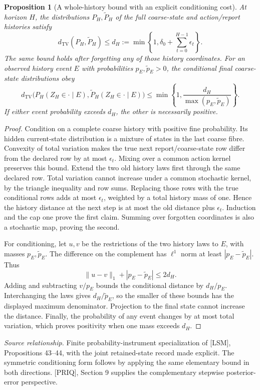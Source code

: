 \documentclass[11pt,oneside,openany]{book}
\newtheorem{proposition}[theorem]{Proposition}
\theoremstyle{definition}\newtheorem{definition}[theorem]{Definition}
\newcommand{\TV}{d_{\mathrm{TV}}}
\newcommand{\source}[1]{\par{\small\textit{Source relationship.} #1}\par}
\begin{document}
\begin{proposition}[A whole-history bound with an explicit conditioning cost]\label{r:history-bound}
At horizon $H$, the distributions $P_H,\widetilde P_H$ of the full coarse-state and action/report histories satisfy
\[
 \TV(P_H,\widetilde P_H)\le d_H:=\min\left\{1,\delta_0+\sum_{t=0}^{H-1}\epsilon_t\right\}.
\]
The same bound holds after forgetting any of those history coordinates. For an observed history event $E$ with probabilities $p_E,\widetilde p_E>0$, the conditional final coarse-state distributions obey
\[
 \TV\bigl(P_H(Z_H\in\cdot\mid E),\widetilde P_H(Z_H\in\cdot\mid E)\bigr)
 \le\min\left\{1,\frac{d_H}{\max(p_E,\widetilde p_E)}\right\}.
\]
If either event probability exceeds $d_H$, the other is necessarily positive.
\end{proposition}
\begin{proof}
Condition on a complete coarse history with positive fine probability. Its hidden current-state distribution is a mixture of states in the last coarse fibre. Convexity of total variation makes the true next report/coarse-state row differ from the declared row by at most $\epsilon_t$. Mixing over a common action kernel preserves this bound. Extend the two old history laws first through the same declared row. Total variation cannot increase under a common stochastic kernel, by the triangle inequality and row sums. Replacing those rows with the true conditional rows adds at most $\epsilon_t$, weighted by a total history mass of one. Hence the history distance at the next step is at most the old distance plus $\epsilon_t$. Induction and the cap one prove the first claim. Summing over forgotten coordinates is also a stochastic map, proving the second.

For conditioning, let $u,v$ be the restrictions of the two history laws to $E$, with masses $p_E,\widetilde p_E$. The difference on the complement has $\ell^1$ norm at least $|p_E-\widetilde p_E|$. Thus
\[
 \|u-v\|_1+|p_E-\widetilde p_E|\le2d_H.
\]
Adding and subtracting $v/p_E$ bounds the conditional distance by $d_H/p_E$. Interchanging the laws gives $d_H/\widetilde p_E$, so the smaller of these bounds has the displayed maximum denominator. Projection to the final state cannot increase the distance. Finally, the probability of any event changes by at most total variation, which proves positivity when one mass exceeds $d_H$.
\end{proof}
\source{Finite probability-instrument specialization of [LSM], Propositions 43--44, with the joint retained-state record made explicit. The symmetric conditioning form follows by applying the same elementary bound in both directions. [PRIQ], Section 9 supplies the complementary stepwise posterior-error perspective.}
\end{document}
